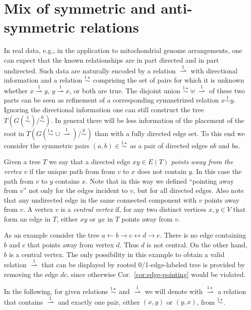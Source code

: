 \documentclass[smallextended]{svjour3}
\newcommand{\Ro}{\mathrel{\overset{0}{\sim}}}
\newcommand{\Rl}{\mathrel{\overset{1}{\sim}}}
\newcommand{\Rlstar}{\mathrel{\overset{1\star}{\sim}}}
\newcommand{\Rldstar}{\mathrel{\overset{1\star}{\rightharpoonup}}}
\newcommand{\Rld}{\mathrel{\overset{1}{\rightharpoonup}}}
\begin{document}
\section{Mix of symmetric and anti-symmetric relations}

In real data, e.g., in the application to mitochondrial genome
arrangements, one can expect that the known relationships are in part
directed and in part undirected. Such data are naturally encoded by a
  relation $\Rld$ with directional information and a relation $\Rlstar$
  comprising the set of pairs for which it is unknown whether $x\Rld y$,
  $y\Rld x$, or both are true. The disjoint union $\Rlstar\uplus\Rld$ of
these two parts can be seen as refinement of a corresponding symmetrized
relation $x\Rl y$.  Ignoring the directional information one can still
construct the tree $T(G(\Rl)/\Ro)$.  In general there will be less
information of the placement of the root in $T(G(\Rlstar\cup\Rld)/\Ro)$
than with a fully directed edge set. To this end we consider the symmetric
pairs $(a,b)\in\Rlstar$ as a pair of directed edges $ab$ and $ba$.

Given a tree $T$ we say that a directed edge $xy \in E(T)$ \emph{points
  away from the vertex $v$} if the unique path from from $v$ to $x$ does
not contain $y$. In this case the path from $v$ to $y$ contains $x$.  Note
that in this way we defined ``pointing away from $v$'' not only for the
edges incident to $v$, but for all directed edges. Also note that any
undirected edge in the same connected component with $v$ points away from
$v$.  A vertex $v$ is a \emph{central vertex} if, for any two distinct
vertices $x,y\in V$ that form an edge in $T$, either $xy$ or $yx$ in $T$
points away from $v$.

As an example consider the tree $a\leftarrow b\rightarrow c \leftrightarrow
d\rightarrow e$.  There is no edge containing $b$ and $c$ that points away
from vertex $d$.  Thus $d$ is not central. On the other hand, $b$ is a
central vertex. The only possibility in this example to obtain a valid
relation $\Rld$ that can be displayed by rooted 0/1-edge-labeled tree is
provided by removing the edge $dc$, since otherwise Cor.\
\ref{cor:edge-pointing} would be violated.

In the following, for given relations $\Rlstar$ and $\Rld$ we will denote
with $\Rldstar$ a relation that contains $\Rld$ and exactly one pair,
either $(x,y)$ or $(y,x)$, from $\Rlstar$.
\end{document}

